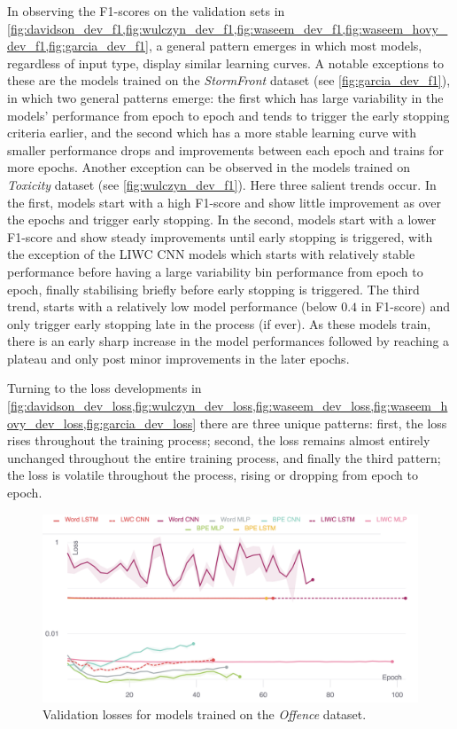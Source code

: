 In observing the F1-scores on the validation sets in \cref{fig:davidson_dev_f1,fig:wulczyn_dev_f1,fig:waseem_dev_f1,fig:waseem_hovy_dev_f1,fig:garcia_dev_f1}, a general pattern emerges in which most models, regardless of input type, display similar learning curves.
A notable exceptions to these are the models trained on the \textit{StormFront} dataset (see \cref{fig:garcia_dev_f1}), in which two general patterns emerge: the first which has large variability in the models' performance from epoch to epoch and tends to trigger the early stopping criteria earlier, and the second which has a more stable learning curve with smaller performance drops and improvements between each epoch and trains for more epochs.
Another exception can be observed in the models trained on \textit{Toxicity} dataset (see \cref{fig:wulczyn_dev_f1}). Here three salient trends occur.
In the first, models start with a high F1-score and show little improvement as over the epochs and trigger early stopping. 
In the second, models start with a lower F1-score and show steady improvements until early stopping is triggered,
with the exception of the LIWC CNN models which starts with relatively stable performance before having a large variability bin performance from epoch to epoch, finally stabilising briefly before early stopping is triggered.
The third trend, starts with a relatively low model performance (below $0.4$ in F1-score) and only trigger early stopping late in the process (if ever). As these models train, there is an early sharp increase in the model performances followed by reaching a plateau and only post minor improvements in the later epochs.

Turning to the loss developments in \cref{fig:davidson_dev_loss,fig:wulczyn_dev_loss,fig:waseem_dev_loss,fig:waseem_hovy_dev_loss,fig:garcia_dev_loss} there are three unique patterns: first, the loss rises throughout the training process; second, the loss remains almost entirely unchanged throughout the entire training process, and finally the third pattern; the loss is volatile throughout the process, rising or dropping from epoch to epoch.


\begin{figure}
    \centering
    \includegraphics[width=\textwidth]{davidson_dev_loss_stderr_logscale.pdf}
    \caption{Validation losses for models trained on the \textit{Offence} dataset.}
    \label{fig:davidson_dev_loss}
\end{figure}

